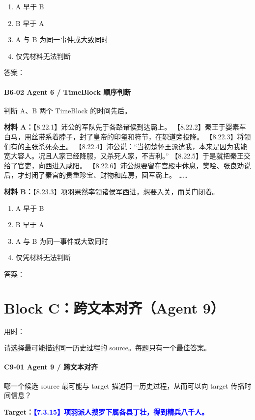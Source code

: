 \documentclass[fontset=none,11pt,a4paper]{ctexart}
\newcommand{\answerline}[1]{\underline{\hspace{#1}}}
\newcommand{\blocktime}{\vspace{0.25em}\noindent 用时：\answerline{4cm}\par\vspace{0.6em}}
\begin{document}
\begin{enumerate}[label=\Alph*.]
  \item A 早于 B
  \item B 早于 A
  \item A 与 B 为同一事件或大致同时
  \item 仅凭材料无法判断
\end{enumerate}
答案：\answerline{2.2cm}

\paragraph{B6-02 \quad Agent 6 / TimeBlock 顺序判断}
判断 A、B 两个 TimeBlock 的时间先后。


\textbf{材料 A：}【8.22.1】沛公的军队先于各路诸侯到达霸上。 【8.22.2】秦王于婴素车白马，用丝带系着脖子，封了皇帝的印玺和符节，在轵道旁投降。 【8.22.3】将领们有的主张杀死秦王。 【8.22.4】沛公说：“当初楚怀王派遣我，本来是因为我能宽大容人。况且人家已经降服，又杀死人家，不吉利。” 【8.22.5】于是就把秦王交给了官吏，向西进入咸阳。 【8.22.6】沛公想要留在宫殿中休息，樊哙、张良劝说后，才封闭了秦宫的贵重珍宝、财物和库房，回军霸上。 ……

\textbf{材料 B：}【8.23.3】项羽果然率领诸侯军西进，想要入关，而关门闭着。


\begin{enumerate}[label=\Alph*.]
  \item A 早于 B
  \item B 早于 A
  \item A 与 B 为同一事件或大致同时
  \item 仅凭材料无法判断
\end{enumerate}
答案：\answerline{2.2cm}


\newpage
\section{Block C：跨文本对齐（Agent 9）}
\blocktime
请选择最可能描述同一历史过程的 source。每题只有一个最佳答案。

\paragraph{C9-01 \quad Agent 9 / 跨文本对齐}
哪一个候选 source 最可能与 target 描述同一历史过程，从而可以向 target 传播时间信息？

\textbf{Target：}\textcolor{blue}{\textbf{【7.3.15】项羽派人搜罗下属各县丁壮，得到精兵八千人。}}
\end{document}
